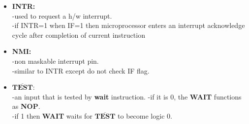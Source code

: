 \documentclass[12pt]{article}
\begin{document}
\begin{itemize}
\begin{itemize}
		\item\textbf{INTR:}\\
		-used to request a h/w interrupt.\\
		-if INTR=1 when IF=1 then microprocessor enters an interrupt acknowledge cycle after completion of current instruction
		
		\item\textbf{NMI:}\\
		-non maskable interrupt pin.\\
		-similar to INTR except do not check IF flag.
		
		\item$\overline{\textbf{TEST}}:$\\
		-an input that is tested by \textbf{wait} instruction.
		-if it is 0, the \textbf{WAIT} functions as \textbf{NOP}.\\
		-if 1 then \textbf{WAIT} waits for   $\overline{\textbf{TEST}}$ to become logic 0.
	\end{itemize}
\end{itemize}

\newpage

\end{document}
